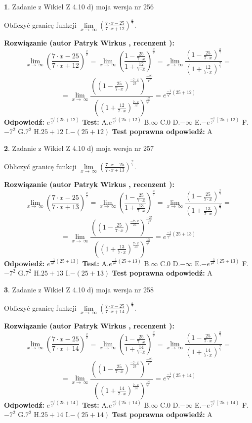 \documentclass[12pt, a4paper]{article}
\theoremstyle{definition} %
\newtheorem{zad}{}
\newcommand{\zadStart}[1]{\begin{zad}#1\newline}
\newcommand{\zadStop}{\end{zad}}
\newcommand{\rozwStart}[2]{\noindent \textbf{Rozwiązanie (autor #1 , recenzent #2): }\newline}
\newcommand{\rozwStop}{\newline}
\newcommand{\odpStart}{\noindent \textbf{Odpowiedź:}\newline}
\newcommand{\odpStop}{\newline}
\newcommand{\testStart}{\noindent \textbf{Test:}\newline}
\newcommand{\testStop}{\newline}
\newcommand{\kluczStart}{\noindent \textbf{Test poprawna odpowiedź:}\newline}
\newcommand{\kluczStop}{\newline}
\begin{document}
\zadStart{Zadanie z Wikieł Z 4.10 d) moja wersja nr 256}


Obliczyć granicę funkcji  $\lim\limits_{x\to\ \infty}(\frac{7\cdot x-25}{7\cdot x+12})^{\frac{x}{7}}$.
\zadStop
\rozwStart{Patryk Wirkus}{}
$$\lim\limits_{x\to\ \infty}(\frac{7\cdot x-25}{7\cdot x+12})^{\frac{x}{7}} = \lim\limits_{x\to\ \infty}(\frac{1-\frac{25}{7\cdot x}}{1+\frac{12}{7\cdot x}})^{\frac{x}{7}}=\lim\limits_{x\to\ \infty}\frac{(1-\frac{25}{7\cdot x})^{\frac{x}{7}}}{(1+\frac{12}{7\cdot x})^{\frac{x}{7}}}=$$
$$=\lim\limits_{x\to\ \infty}\frac{((1-\frac{25}{7\cdot x})^{\frac{-7\cdot x}{25}})^{\frac{-25}{7^{2}}}}{((1+\frac{12}{7\cdot x})^{\frac{7\cdot x}{12}})^{\frac{12}{7^{2}}}}=e^{\frac{-1}{7^{2}}(25+12)}$$
\rozwStop
\odpStart
$e^{\frac{-1}{7^{2}}(25+12)}$
\odpStop
\testStart
A.$e^{\frac{-1}{7^{2}}(25+12)}$ B.$\infty$ C.$0$ D.$-\infty$ E.$-e^{\frac{-1}{7^{2}}(25+12)}$
F.$-7^{2}$ G.$7^{2}$
H.$25+12$
I.$-(25+12)$
\testStop
\kluczStart
A
\kluczStop



\zadStart{Zadanie z Wikieł Z 4.10 d) moja wersja nr 257}


Obliczyć granicę funkcji  $\lim\limits_{x\to\ \infty}(\frac{7\cdot x-25}{7\cdot x+13})^{\frac{x}{7}}$.
\zadStop
\rozwStart{Patryk Wirkus}{}
$$\lim\limits_{x\to\ \infty}(\frac{7\cdot x-25}{7\cdot x+13})^{\frac{x}{7}} = \lim\limits_{x\to\ \infty}(\frac{1-\frac{25}{7\cdot x}}{1+\frac{13}{7\cdot x}})^{\frac{x}{7}}=\lim\limits_{x\to\ \infty}\frac{(1-\frac{25}{7\cdot x})^{\frac{x}{7}}}{(1+\frac{13}{7\cdot x})^{\frac{x}{7}}}=$$
$$=\lim\limits_{x\to\ \infty}\frac{((1-\frac{25}{7\cdot x})^{\frac{-7\cdot x}{25}})^{\frac{-25}{7^{2}}}}{((1+\frac{13}{7\cdot x})^{\frac{7\cdot x}{13}})^{\frac{13}{7^{2}}}}=e^{\frac{-1}{7^{2}}(25+13)}$$
\rozwStop
\odpStart
$e^{\frac{-1}{7^{2}}(25+13)}$
\odpStop
\testStart
A.$e^{\frac{-1}{7^{2}}(25+13)}$ B.$\infty$ C.$0$ D.$-\infty$ E.$-e^{\frac{-1}{7^{2}}(25+13)}$
F.$-7^{2}$ G.$7^{2}$
H.$25+13$
I.$-(25+13)$
\testStop
\kluczStart
A
\kluczStop



\zadStart{Zadanie z Wikieł Z 4.10 d) moja wersja nr 258}


Obliczyć granicę funkcji  $\lim\limits_{x\to\ \infty}(\frac{7\cdot x-25}{7\cdot x+14})^{\frac{x}{7}}$.
\zadStop
\rozwStart{Patryk Wirkus}{}
$$\lim\limits_{x\to\ \infty}(\frac{7\cdot x-25}{7\cdot x+14})^{\frac{x}{7}} = \lim\limits_{x\to\ \infty}(\frac{1-\frac{25}{7\cdot x}}{1+\frac{14}{7\cdot x}})^{\frac{x}{7}}=\lim\limits_{x\to\ \infty}\frac{(1-\frac{25}{7\cdot x})^{\frac{x}{7}}}{(1+\frac{14}{7\cdot x})^{\frac{x}{7}}}=$$
$$=\lim\limits_{x\to\ \infty}\frac{((1-\frac{25}{7\cdot x})^{\frac{-7\cdot x}{25}})^{\frac{-25}{7^{2}}}}{((1+\frac{14}{7\cdot x})^{\frac{7\cdot x}{14}})^{\frac{14}{7^{2}}}}=e^{\frac{-1}{7^{2}}(25+14)}$$
\rozwStop
\odpStart
$e^{\frac{-1}{7^{2}}(25+14)}$
\odpStop
\testStart
A.$e^{\frac{-1}{7^{2}}(25+14)}$ B.$\infty$ C.$0$ D.$-\infty$ E.$-e^{\frac{-1}{7^{2}}(25+14)}$
F.$-7^{2}$ G.$7^{2}$
H.$25+14$
I.$-(25+14)$
\testStop
\kluczStart
A
\kluczStop
\end{document}
